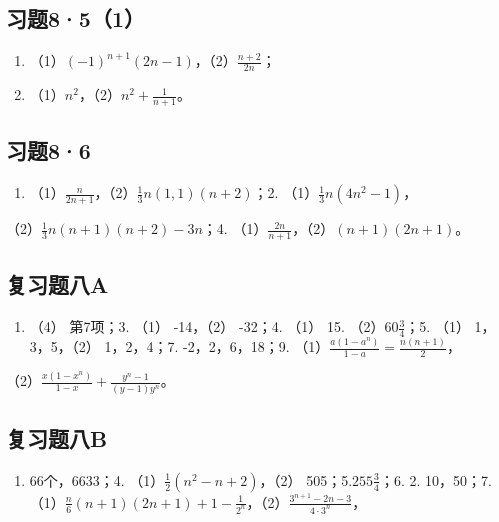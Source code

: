 \subsection{习题8·5（1）}

\begin{enumerate}
\item
  （1）\((-1)^{n+1}(2n-1)\)，（2）\(\frac{n+2}{2n}\)；
\item
  （1）\(n^2\)，（2）\(n^2 + \frac{1}{n + 1}\)。
\end{enumerate}

\subsection{习题8·6}

\begin{enumerate}
\item
  （1）\(\frac{n}{2n + 1}\)，（2）\(\frac{1}{3} n(1,1)(n + 2)\)；2.
  （1）\(\frac{1}{3} n(4n^2 - 1)\)，
\end{enumerate}

（2）\(\frac{1}{3} n(n + 1)(n + 2) - 3n\)；4.
（1）\(\frac{2n}{n + 1}\)，（2）\((n + 1)(2n + 1)\)。

\subsection{复习题八A}

\begin{enumerate}[start=2]
\item
  （4） 第7项；3. （1） -14，（2） -32；4. （1） 15.
  （2）\(60\frac{3}{4}\)；5. （1） 1，3，5，（2） 1，2，4；7.
  -2，2，6，18；9.
  （1）\(\frac{a(1 - a^n)}{1 - a} = \frac{n(n + 1)}{2}\)，
\end{enumerate}

（2）\(\frac{x(1 - x^n)}{1 - x} + \frac{y^n - 1}{(y - 1)y^n}\)。

\subsection{复习题八B}

\begin{enumerate}[start=3]
\item
  66个，6633；4. （1）\(\frac{1}{2} (n^2 - n + 2)\)，（2）
  505；5.\(255\frac{3}{4}\)；6. 2. 10，50；7.
  （1）\(\frac{n}{6} (n + 1)(2n + 1) + 1 - \frac{1}{2^n}\)，（2）\(\frac{3^{n+1} - 2n - 3}{4 \cdot 3^n}\)，
\end{enumerate}

